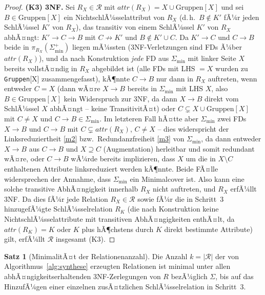 ﻿\documentclass[a4paper,12pt]{report}
\theoremstyle{definition}
\newtheorem{theorem}{Satz}[chapter]
\theoremstyle{remark}
\newcommand{\att}{\mathit{attr}}
\begin{document}
\begin{proof}
\textbf{(K3) 3NF.}
Sei $R_X\in\mathcal{R}$ mit $\att(R_X)=X\cup\text{Gruppen}[X]$ und sei
$B\in\text{Gruppen}[X]$ ein NichtschlÃ¼sselattribut von $R_X$ (d.\,h.\
$B\notin K'$ fÃ¼r jeden SchlÃ¼ssel $K'$ von $R_X$), das transitiv von
einem SchlÃ¼ssel $K'$ von $R_X$ abhÃ¤ngt: $K'\to C\to B$ mit $C\not\to
K'$ und $B\notin K'\cup C$. Da $K'\to C$ und $C\to B$ beide in
$\pi_{R_X}(\Sigma_{\min}^+)$ liegen mÃ¼ssten (3NF-Verletzungen sind FDs
Ã¼ber $\att(R_X)$), und da nach Konstruktion \emph{jede} FD aus
$\Sigma_{\min}$ mit linker Seite $X$ bereits vollstÃ¤ndig in $R_X$
abgebildet ist (alle FDs mit LHS $=X$ wurden zu \texttt{Gruppen}[X]
zusammengefasst), kÃ¶nnte $C\to B$ nur dann in $R_X$ auftreten, wenn
entweder $C=X$ (dann wÃ¤re $X\to B$ bereits in $\Sigma_{\min}$ mit
LHS $X$, also $B\in\text{Gruppen}[X]$ kein Widerspruch zur
3NF, da dann $X\to B$ direkt vom SchlÃ¼ssel $X$ abhÃ¤ngt -- keine
TransitivitÃ¤t) oder $C\subsetneq X\cup\text{Gruppen}[X]$ mit $C\neq X$
und $C\to B\in\Sigma_{\min}$. Im letzteren Fall hÃ¤tte aber
$\Sigma_{\min}$ zwei FDs $X\to B$ und $C\to B$ mit $C\subsetneq
\att(R_X)$, $C\neq X$ -- dies widerspricht der Linksreduziertheit
\ref{m2} bzw.\ Redundanzfreiheit \ref{m3} von $\Sigma_{\min}$, da dann
entweder $X\to B$ aus $C\to B$ und $X\supseteq C$ (Augmentation)
herleitbar und somit redundant wÃ¤re, oder $C\to B$ wÃ¼rde bereits
implizieren, dass $X$ um die in $X\setminus C$ enthaltenen Attribute
linksreduziert werden kÃ¶nnte. Beide FÃ¤lle widersprechen der Annahme,
dass $\Sigma_{\min}$ ein Minimalcover ist. Also kann eine solche
transitive AbhÃ¤ngigkeit innerhalb $R_X$ nicht auftreten, und $R_X$
erfÃ¼llt 3NF. Da dies fÃ¼r jede Relation $R_X\in\mathcal{R}$ sowie fÃ¼r
die in Schritt~3 hinzugefÃ¼gte SchlÃ¼sselrelation $R_K$ (die nach
Konstruktion keine NichtschlÃ¼sselattribute mit transitiven
AbhÃ¤ngigkeiten enthÃ¤lt, da $\att(R_K)=K$ oder $K$ plus hÃ¶chstens
durch $K$ direkt bestimmte Attribute) gilt, erfÃ¼llt $\mathcal{R}$
insgesamt (K3). \qedhere
\end{proof}

\begin{theorem}[MinimalitÃ¤t der Relationenanzahl]
\label{thm:synthese-minimal}
Die Anzahl $k=|\mathcal{R}|$ der von Algorithmus~\ref{alg:synthese}
erzeugten Relationen ist minimal unter allen abhÃ¤ngigkeitserhaltenden
3NF-Zerlegungen von $R$ bezÃ¼glich $\Sigma$, bis auf das
HinzufÃ¼gen einer einzelnen zusÃ¤tzlichen SchlÃ¼sselrelation in
Schritt~3.
\end{theorem}
\end{document}
